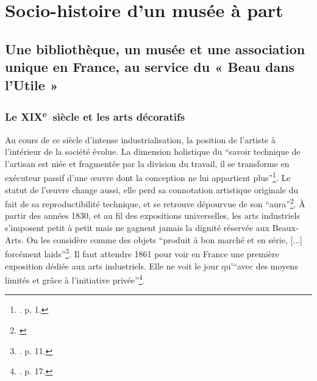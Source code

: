 \part{Socio-histoire d'un musée à part}


\chapter{Une bibliothèque, un musée et une association unique en France, au service du « Beau dans l’Utile »}

\section{Le \textsc{XIX}\textsuperscript{e}~siècle et les arts décoratifs}

Au cours de ce siècle d'intense industrialisation, la position de l'artiste à l'intérieur de la société évolue. La dimension holistique du \enquote{savoir technique de l'artisan est niée et fragmentée par la division du travail, il se transforme en exécuteur passif d'une œuvre dont la conception ne lui appartient plus}\footnote{\cite{froissart_union_1990}. p. 1.}. Le statut de l’œuvre change aussi, elle perd sa connotation artistique originale du fait de sa reproductibilité technique, et se retrouve dépourvue de son \enquote{aura}\footnote{\cite{benjamin_walter_oeuvre_2013}}. À partir des années 1830, et au fil des expositions universelles, les arts industriels s'imposent petit à petit mais ne gagnent jamais la dignité réservée aux Beaux-Arts. On les considère comme des objets \enquote{produit à bon marché et en série, [...] forcément laids}\footnote{\cite{froissart_union_1990}. p. 11.}. Il faut attendre 1861 pour voir en France une première exposition dédiée aux arts industriels. Elle ne voit le jour qu'\enquote{avec des moyens limités et grâce à l'initiative privée}\footnote{\cite{froissart_union_1990}. p. 17.}. 

